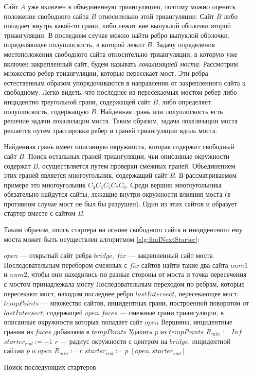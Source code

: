 \documentclass[12pt]{article}
\begin{document}
Сайт $A$ уже включен в объединенную триангуляцию,
поэтому можно оценить положение свободного сайта $B$ относительно этой триангуляции.
Сайт $B$ либо попадает внутрь какой-то грани, либо лежит вне выпуклой оболочки второй триангуляции.
В последнем случае можно найти ребро выпуклой оболочки, определяющее полуплоскость, в которой лежит $B$.
Задачу определения местоположения свободного сайта относительно триангуляции,
в которую уже включен закрепленный сайт, будем называть {\itshape локализацией моста}.
Рассмотрим множество ребер триангуляции, которые пересекает мост.
Эти ребра естественным образом упорядочиваются в направлении от закрепленного сайта к свободному.
Легко видеть, что последнее из пересекаемых мостом ребер либо инцидентно треугольной грани,
содержащей сайт $B$, либо определяет полуплоскость, содержащую $B$.
Найденная грань или полуплоскость есть решение задачи локализации моста.
Таким образом, задача локализации моста решается путем трассировки ребер и граней триангуляции вдоль моста.

Найденная грань имеет описанную окружность, которая содержит свободный сайт $B$.
Поиск остальных граней триангуляции, чьи описанные окружности содержат $B$,
осуществляется путем проверки смежных граней.
Объединением этих граней является многоугольник, содержащий сайт $B$.
В рассматриваемом примере это многоугольник $C_3C_4C_5C_7C_6$.
Среди вершин многоугольника обязательно найдутся сайты,
лежащие внутри окружности влияния моста (в противном случае мост не был бы разрушен).
Один из этих сайтов и образует стартер вместе с сайтом $B$.

Таким образом, поиск стартера на основе свободного сайта и инцидентного ему моста
может быть осуществлен алгоритмом \ref{alg:findNextStarter}:

\begin{algorithm}[htb!]
\begin{algorithmic}[1]
	\State $open$ --- открытый сайт ребра $bridge$, $fix$ --- закрепленный сайт моста
	\State Последовательным перебором смежных с $fix$ сайтов найти такие два сайта $num1$ и $num2$, чтобы они находились по разные стороны от моста и точка пересечения с мостом принадлежала мосту
	\State Последовательным переходом по ребрам, которые пересекают мост, находим последнее ребро $lastIntersect$, пересекающее мост.
	\State $tempPoints$ --- множество сайтов, инцидентных грани, построенной поворотом от $lastIntersect$, содержащей $open$
	\State $faces$ --- смежные грани триангуляции, в описанные окружности которых попадает сайт $open$
	\State Вершины, инцидентные граням из $faces$ добавляем в $tempPoints$
			\State Удалить $p$ из $tempPoints$
		\EndIf
	\EndFor
	\State $R_{min} := Inf$
	\State $starter_{end} := -1$
		\State $r$ --- радиус окружности с центром на $bridge$, инцидентной сайтам $p$ и $open$
			\State $R_{min} := r$
			\State $starter_{end} := p$
		\EndIf
	\EndFor
	\Return $[open, starter_{end}]$
\EndProcedure
\end{algorithmic}
\caption{Поиск последующих стартеров}
\label{alg:findNextStarter}
\end{algorithm}
\end{document}
